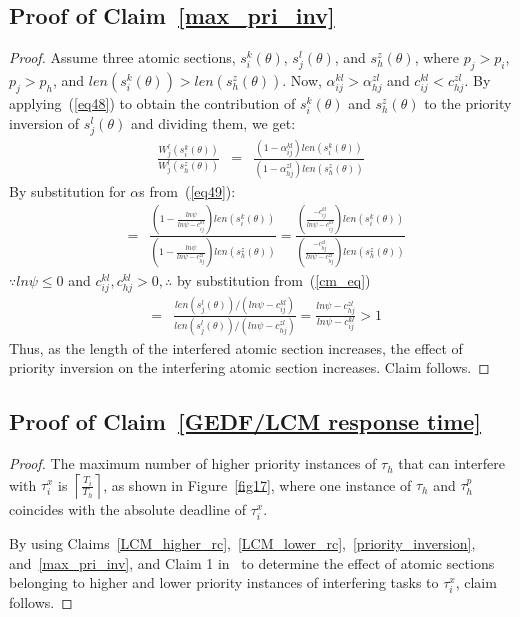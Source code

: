 \documentclass[letter]{sig-alternate}
\begin{document}
\subsection{\label{proof_max_pri_inv} Proof of Claim~\ref{max_pri_inv}}
\begin{proof}
Assume three atomic sections, $s_i^k(\theta)$, $s_j^l(\theta)$, and $s_h^z(\theta)$, where $p_j>p_i$, $p_j>p_h$, and $len(s_i^k(\theta))>len(s_h^z(\theta))$. Now, $\alpha_{ij}^{kl}>\alpha_{hj}^{zl}$ and $c_{ij}^{kl}<c_{hj}^{zl}$. By applying~(\ref{eq48}) to obtain the contribution of $s_i^k(\theta)$ and $s_h^z(\theta)$ to the priority inversion of $s_j^l(\theta)$ and dividing them, we get:
\begin{eqnarray*}
\frac{W_{j}^{l}(s_{i}^{k}(\theta))}{W_{j}^{l}(s_{h}^{z}(\theta))} & = & \frac{\left(1-\alpha_{ij}^{kl}\right)len(s_{i}^{k}(\theta))}{\left(1-\alpha_{hj}^{zl}\right)len(s_{h}^{z}(\theta))}
\end{eqnarray*}
By substitution for $\alpha$s from~(\ref{eq49}):
\begin{eqnarray*}
 & = & \frac{(1-\frac{ln\psi}{ln\psi-c_{ij}^{kl}})len(s_{i}^{k}(\theta))}{(1-\frac{ln\psi}{ln\psi-c_{hj}^{zl}})len(s_{h}^{z}(\theta))}
  =  \frac{(\frac{-c_{ij}^{kl}}{ln\psi-c_{ij}^{kl}})len(s_{i}^{k}(\theta))}{(\frac{-c_{hj}^{zl}}{ln\psi-c_{hj}^{zl}})len(s_{h}^{z}(\theta))}\end{eqnarray*}
$\because ln\psi \le 0$ and $c_{ij}^{kl},c_{hj}^{kl} > 0, \therefore$ by substitution from~(\ref{cm_eq})
\begin{eqnarray*}
 & = & \frac{len(s_{j}^{l}(\theta))/(ln\psi-c_{ij}^{kl})}{len(s_{j}^{l}(\theta))/(ln\psi-c_{hj}^{zl})}
  =  \frac{ln\psi-c_{hj}^{zl}}{ln\psi-c_{ij}^{kl}}>1\end{eqnarray*}
Thus, as the length of the interfered atomic section increases, the effect of priority inversion on the interfering atomic section increases. Claim follows.
\end{proof}
\subsection{\label{proof_GEDF/LCM response time}Proof of Claim~\ref{GEDF/LCM response time}}
\begin{proof}
The maximum number of higher priority instances of $\tau_h$ that can interfere with $\tau_i^x$ is $\left\lceil\frac{T_i}{T_h}\right\rceil$, as shown in Figure~\ref{fig17}, where one instance of $\tau_h$ and $\tau_h^p$ coincides with the absolute deadline of $\tau_i^x$.


By using Claims~\ref{LCM_higher_rc},~\ref{LCM_lower_rc},~\ref{priority_inversion}, and~\ref{max_pri_inv}, and Claim 1 in~\cite{stmconcurrencycontrol:emsoft11} to determine the effect of atomic sections belonging to higher and lower priority instances of interfering tasks to $\tau_i^x$, claim follows.
\end{proof}
\end{document}
